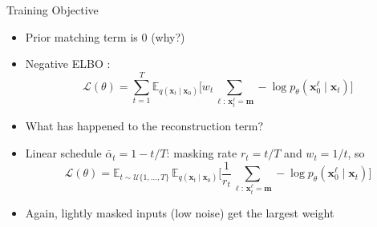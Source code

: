 \documentclass[11pt,compress,t,notes=noshow, xcolor=table]{beamer}
\providecommand{\bx}{\mathbf{x}}
\begin{document}
\begin{frame}{Training Objective}
 
\vfill
 
\begin{itemize}
\item Prior matching term is $0$ (why?)
\item Negative ELBO :
\begin{equation*}
\mathcal{L}(\theta) = \sum_{t=1}^{T} \mathbb{E}_{q(\bx_t \mid \bx_0)}\Big[w_t \sum_{\ell:\, \bx_t^\ell = \mathbf{m}} -\log p_\theta(\bx_0^\ell \mid \bx_t)\Big]
\end{equation*}
\item What has happened to the reconstruction term?
\item Linear schedule $\bar{\alpha}_t = 1 - t/T$: masking rate $r_t = t/T$ and $w_t = 1/t$, so
\begin{equation*}
\mathcal{L}(\theta) = \mathbb{E}_{t \sim \mathcal{U}\{1, \dots, T\}}\, \mathbb{E}_{q(\bx_t \mid \bx_0)}\Big[\frac{1}{r_t} \sum_{\ell:\, \bx_t^\ell = \mathbf{m}} -\log p_\theta(\bx_0^\ell \mid \bx_t)\Big]
\end{equation*}
\item Again, lightly masked inputs (low noise) get the largest weight
\end{itemize}
 
\vfill
 
\end{frame}
\end{document}
